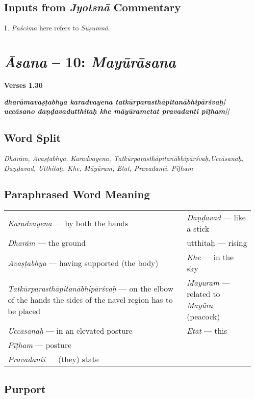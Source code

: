 \subsection*{Inputs from \textit{Jyotsnā} Commentary}
\vspace{-5pt}

1. \textit{Paścima} here refers to \textit{Suṣumnā}.

\section*{\textit{Āsana} -- 10: \textit{Mayūrāsana}}


\noindent 
\textbf{Verses 1.30}

\begin{shloka}
\textit{\textbf{dharāmavaṣṭabhya karadvayena tatkūrparasthāpitanābhipārśvaḥ|}\\
\textbf{uccāsano daṇḍavadutthitaḥ khe māyūrametat pravadanti pīṭham||}}
\end{shloka}

\subsection*{Word Split}

\textit{Dharām, Avaṣṭabhya, Karadvayena, Tatkūrparasthāpitanābhipārśvaḥ,\break Uccāsanaḥ, Daṇḍavad, Utthitaḥ, Khe, Māyūram, Etat, Pravadanti, Pīṭham}

\subsection*{Paraphrased Word Meaning}

\begin{longtable}{>{\noindent\raggedright}p{5cm}>{\noindent\raggedright}p{5cm}}
\textit{Karadvayena} --- by both the hands &  \textit{Daṇḍavad} --- like  a stick\tabularnewline
\textit{Dharām} --- the ground  & utthitaḥ --- rising\tabularnewline
\textit{Avaṣṭabhya} --- having supported (the body) & \textit{Khe} --- in the sky\tabularnewline
\textit{Tatkūrparasthāpitanābhipārśvaḥ} --- on the elbow of the hands the sides of the navel  region has to be placed & \textit{Māyūram} --- related to  \textit{Mayūra} (peacock)\tabularnewline
\textit{Uccāsanaḥ} --- in an elevated posture & \textit{Etat} --- this\tabularnewline
\textit{Pīṭham} --- posture  & \tabularnewline
\textit{Pravadanti} --- (they) state & 
\end{longtable}

\subsection*{Purport}


